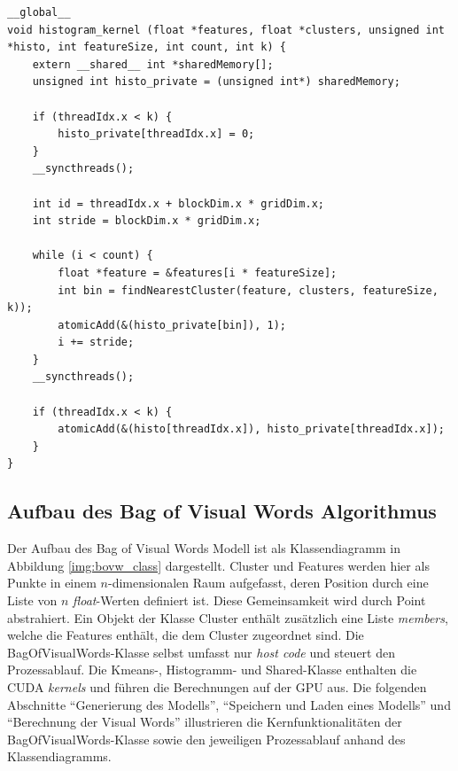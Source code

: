 \lstset{language=C}
\begin{lstlisting}
__global__
void histogram_kernel (float *features, float *clusters, unsigned int *histo, int featureSize, int count, int k) {
	extern __shared__ int *sharedMemory[];
	unsigned int histo_private = (unsigned int*) sharedMemory;
	
	if (threadIdx.x < k) {
		histo_private[threadIdx.x] = 0;		
	}
	__syncthreads();

	int id = threadIdx.x + blockDim.x * gridDim.x;
	int stride = blockDim.x * gridDim.x;
	
	while (i < count) {
		float *feature = &features[i * featureSize];
		int bin = findNearestCluster(feature, clusters, featureSize, k)); 
		atomicAdd(&(histo_private[bin]), 1);
		i += stride;	
	}
	__syncthreads();
	
	if (threadIdx.x < k) {
		atomicAdd(&(histo[threadIdx.x]), histo_private[threadIdx.x]);		
	}
}
\end{lstlisting} 

\subsection{Aufbau des Bag of Visual Words Algorithmus}

Der Aufbau des Bag of Visual Words Modell ist als Klassendiagramm in Abbildung \ref{img:bovw_class} dargestellt. Cluster und Features werden hier als Punkte in einem $n$-dimensionalen Raum aufgefasst, deren Position durch eine Liste von $n$ \textit{float}-Werten definiert ist. Diese Gemeinsamkeit wird durch Point abstrahiert. Ein Objekt der Klasse Cluster enthält zusätzlich eine Liste \textit{members}, welche die Features enthält, die dem Cluster zugeordnet sind.
Die BagOfVisualWords-Klasse selbst umfasst nur \textit{host code} und steuert den Prozessablauf. Die Kmeans-, Histogramm- und Shared-Klasse enthalten die CUDA \textit{kernels} und führen die Berechnungen auf der GPU aus.\newline
Die folgenden Abschnitte \enquote{Generierung des Modells}, \enquote{Speichern und Laden eines Modells} und \enquote{Berechnung der Visual Words} illustrieren die Kernfunktionalitäten der BagOfVisualWords-Klasse sowie den jeweiligen Prozessablauf anhand des Klassendiagramms.

